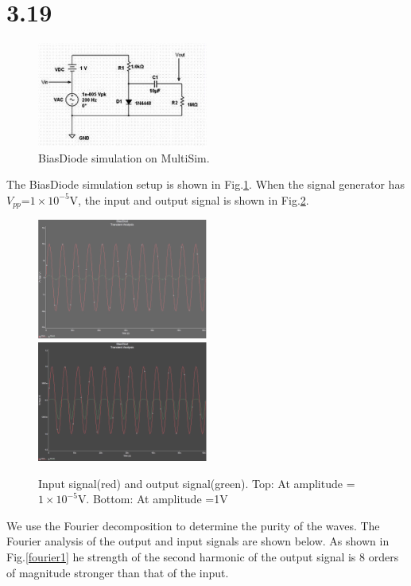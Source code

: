 \documentclass[authoryear, 12pt,5p, times]{elsarticle}
\begin{document}
\section*{3.19}
\begin{figure}[h!]
\center
\includegraphics[width=0.5\textwidth]{figure/3_19_setup}
\caption{BiasDiode simulation on MultiSim.}
\label{3_19_setup}
\end{figure}
The BiasDiode simulation setup is shown in Fig.\ref{3_19_setup}. When the signal generator has $V_{pp}$=$1\times10^{-5}$V, the input and output signal is shown in Fig.\ref{firstrow}.
\begin{figure}[h!]
\center
\includegraphics[width=0.5\textwidth]{figure/1}
\includegraphics[width=0.5\textwidth]{figure/Part2-Part1}
\caption{Input signal(red) and output signal(green). Top: At amplitude =$1\times10^{-5}$V. Bottom: At amplitude =1V}
\label{firstrow}
\end{figure}
\par  We use the Fourier decomposition to determine the purity of the waves. The Fourier analysis of the output and input signals are shown below. As shown in Fig.\ref{fourier1} he strength of the second harmonic of the output signal is 8 orders of magnitude stronger than that of the input. 
\end{document}
